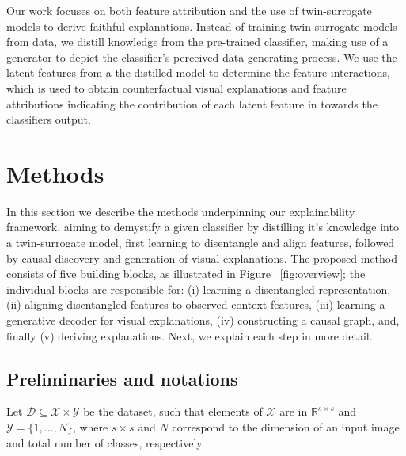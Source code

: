 \documentclass{article}
\newcommand{\ft}[1]{{\textcolor{red}{#1}}}
\begin{document}
Our work focuses on both feature attribution and the use of twin-surrogate models to derive faithful explanations.
Instead of training twin-surrogate models from data, we distill knowledge from the pre-trained classifier, making use of a generator to depict the classifier's perceived data-generating process.
We use the latent features from a the distilled model to determine the feature interactions, which is used to obtain counterfactual visual explanations and feature attributions indicating the contribution of each latent feature in towards the classifiers output. 


\section{Methods} 



In this section we describe the methods underpinning our explainability framework, aiming to demystify a given classifier by distilling it's knowledge into a twin-surrogate model, first learning to disentangle and align features, followed by causal discovery and generation of visual explanations.
The proposed method consists of five building blocks, as illustrated in Figure ~\ref{fig:overview}; the individual blocks are responsible for: (i) learning a disentangled representation, (ii) aligning disentangled features to observed context features, (iii) learning a generative decoder for visual explanations, (iv) constructing a causal graph, and, finally (v) deriving explanations.
Next, we explain each step in more detail.

\subsection{Preliminaries and notations}
\label{subsection:prelims_notations}
Let $\mathcal{D} \subseteq \mathcal{X} \times \mathcal{Y}$ be the dataset, such that elements of $\mathcal{X}$ are in  $\mathbb{R}^{s \times s}$ and $\mathcal{Y} %
= \{1, \ldots, N\}$, where $s \times s$ and $N$ correspond to the dimension of an input image and total number of classes, respectively.
\end{document}
